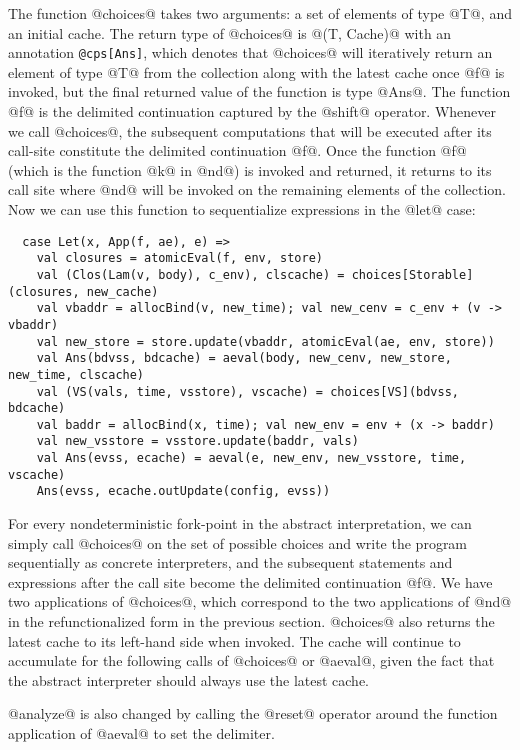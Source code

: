 \documentclass[acmsmall, screen]{acmart}\settopmatter{}
\begin{document}
The function @choices@ takes two arguments: a set of elements of type @T@, and an initial cache.
The return type of @choices@ is @(T, Cache)@ with an annotation \verb|@cps[Ans]|, which
denotes that @choices@ will iteratively return an element of type @T@ from the collection
along with the latest cache once @f@ is invoked, but the final returned value of the
function is type @Ans@.
The function @f@ is the delimited continuation captured by the @shift@ operator.
Whenever we call @choices@, the subsequent computations that will be executed after its call-site
constitute the delimited continuation @f@.
Once the function @f@ (which is the function @k@ in @nd@) is invoked and returned,
it returns to its call site where @nd@ will be invoked on the remaining elements of the collection.
Now we can use this function to sequentialize expressions in the @let@ case:

\begin{lstlisting}
  case Let(x, App(f, ae), e) =>
    val closures = atomicEval(f, env, store)
    val (Clos(Lam(v, body), c_env), clscache) = choices[Storable](closures, new_cache)
    val vbaddr = allocBind(v, new_time); val new_cenv = c_env + (v -> vbaddr)
    val new_store = store.update(vbaddr, atomicEval(ae, env, store))
    val Ans(bdvss, bdcache) = aeval(body, new_cenv, new_store, new_time, clscache)
    val (VS(vals, time, vsstore), vscache) = choices[VS](bdvss, bdcache)
    val baddr = allocBind(x, time); val new_env = env + (x -> baddr)
    val new_vsstore = vsstore.update(baddr, vals)
    val Ans(evss, ecache) = aeval(e, new_env, new_vsstore, time, vscache)
    Ans(evss, ecache.outUpdate(config, evss))
\end{lstlisting}

For every nondeterministic fork-point in the abstract interpretation, we can simply call
@choices@ on the set of possible choices and write the program sequentially as concrete
interpreters, and the subsequent statements and expressions after the call site become
the delimited continuation @f@. We have two applications of @choices@, which correspond
to the two applications of @nd@ in the refunctionalized form in the previous section.
@choices@ also returns the latest cache to its left-hand side when invoked.
The cache will continue to accumulate for the following calls of @choices@ or @aeval@,
given the fact that the abstract interpreter should always use the latest cache.

@analyze@ is also changed by calling the @reset@ operator around the
function application of @aeval@ to set the delimiter.
\end{document}
